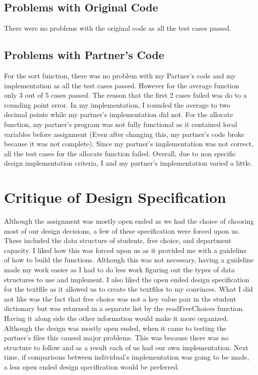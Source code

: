 \documentclass[12pt]{article}
\begin{document}
\subsection{Problems with Original Code}
There were no problems with the original code as all the test cases passed.

\subsection{Problems with Partner's Code}
For the sort function, there was no problem with my Partner's code and my implementation as all the test cases passed. However for the average function only 3 out of 5 cases passed. The reason that the first 2 cases failed was do to a rounding point error. In my implementation, I rounded the average to two decimal points while my partner's implementation did not. For the allocate function, my partner's program was not fully functional as it contained local variables before assignment (Even after changing this, my partner's code broke because it was not complete). Since my partner's implementation was not correct, all the test cases for the allocate function failed. Overall, due to non specific design implementation criteria, I and my partner's implementation varied a little. 

\section{Critique of Design Specification}

Although the assignment was mostly open ended as we had the choice of choosing most of our design decisions, a few of these specification were forced upon us. These included the data structure of students, free choice, and department capacity. I liked how this was forced upon us as it provided me with a guideline of how to build the functions. Although this was not necessary, having a guideline made my work easier as I had to do less work figuring out the types of data structures to use and implement. I also liked the open ended design specification for the textfile as it allowed us to create the textfiles to my convinces. What I did not like was the fact that free choice was not a key value pair in the student dictionary but was returned in a separate list by the readFreeChoices function. Having it along side the other information would make it more organized. Although the design was mostly open ended, when it came to testing the partner's files this caused major problems. This was because there was no structure to follow and as a result each of us had our own implementation. Next time, if comparisons between individual's implementation was going to be made, a less open ended design specification would be preferred.
\end{document}
